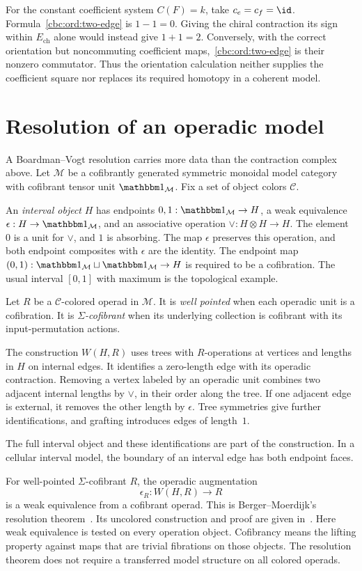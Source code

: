 For the constant coefficient system $C(F)=k$, take $c_e=c_f=\id$. Formula~\eqref{cbc:ord:two-edge} is $1-1=0$. Giving the chiral contraction its sign within $E_{\mathrm{ch}}$ alone would instead give $1+1=2$. Conversely, with the correct orientation but noncommuting coefficient maps,~\eqref{cbc:ord:two-edge} is their nonzero commutator. Thus the orientation calculation neither supplies the coefficient square nor replaces its required homotopy in a coherent model.

\section{Resolution of an operadic model}
A Boardman--Vogt resolution carries more data than the contraction complex above. Let $\mathcal M$ be a cofibrantly generated symmetric monoidal model category with cofibrant tensor unit $\mathbbm1_{\mathcal M}$. Fix a set of object colors $\mathcal C$.

An \emph{interval object} $H$ has endpoints $0,1:\mathbbm1_{\mathcal M}\to H$, a weak equivalence $\epsilon:H\to\mathbbm1_{\mathcal M}$, and an associative operation $\vee:H\otimes H\to H$. The element $0$ is a unit for $\vee$, and $1$ is absorbing. The map $\epsilon$ preserves this operation, and both endpoint composites with $\epsilon$ are the identity. The endpoint map $(0,1):\mathbbm1_{\mathcal M}\sqcup\mathbbm1_{\mathcal M}\to H$ is required to be a cofibration. The usual interval $[0,1]$ with maximum is the topological example.

Let $R$ be a $\mathcal C$-colored operad in $\mathcal M$. It is \emph{well pointed} when each operadic unit is a cofibration. It is \emph{$\Sigma$-cofibrant} when its underlying collection is cofibrant with its input-permutation actions.

The construction $W(H,R)$ uses trees with $R$-operations at vertices and lengths in $H$ on internal edges. It identifies a zero-length edge with its operadic contraction. Removing a vertex labeled by an operadic unit combines two adjacent internal lengths by $\vee$, in their order along the tree. If one adjacent edge is external, it removes the other length by $\epsilon$. Tree symmetries give further identifications, and grafting introduces edges of length~$1$.

The full interval object and these identifications are part of the construction. In a cellular interval model, the boundary of an interval edge has both endpoint faces.

For well-pointed $\Sigma$-cofibrant $R$, the operadic augmentation
\begin{equation}\label{cbc:ord:w-resolution}
 \epsilon_R:W(H,R)\longrightarrow R
\end{equation}
is a weak equivalence from a cofibrant operad. This is Berger--Moerdijk's resolution theorem~\cite[Theorem~3.5]{BergerMoerdijk2007}. Its uncolored construction and proof are given in~\cite[\S\S4--5]{BergerMoerdijk2006}. Here weak equivalence is tested on every operation object. Cofibrancy means the lifting property against maps that are trivial fibrations on those objects. The resolution theorem does not require a transferred model structure on all colored operads.

